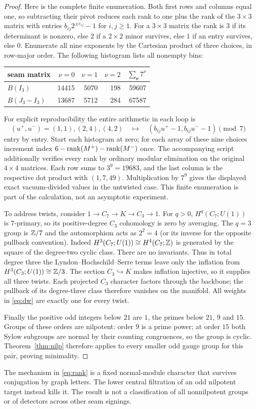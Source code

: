 \begin{proof}
Here is the complete finite enumeration. Both first rows and
columns equal one, so subtracting their pivot reduces each
rank to one plus the rank of the \(3\times3\) matrix with entries
\(b_{ij}2^{\pm e_{ij}}-1\) for \(i,j\ge1\). For a \(3\times3\)
matrix the rank is \(3\) if its determinant is nonzero, else
\(2\) if a \(2\times2\) minor survives, else \(1\) if an entry
survives, else \(0\). Enumerate all nine exponents by the Cartesian
product of three choices, in row-major order. The following
histogram lists all nonempty bins:
\begin{center}
\begin{tabular}{lrrrr}
\toprule
seam matrix & \(\nu=0\) & \(\nu=1\) & \(\nu=2\) &
          \(\sum_{\mathbf e}7^\nu\)\\
\midrule
\(B(I_3)\)       & 14415 & 5070 & 198 & 59607\\
\(B(J_3-I_3)\)   & 13687 & 5712 & 284 & 67587\\
\bottomrule
\end{tabular}
\end{center}
For explicit reproducibility the entire arithmetic in each loop
is
\[
 (u^+,u^-)=(1,1),(2,4),(4,2)\quad
 \longmapsto\quad
 (b_{ij}u^+-1,b_{ij}u^--1)\pmod 7
\]
entry by entry. Start each histogram at zero; for each array of
these nine choices increment index
\(6-\operatorname{rank}(M^+)-\operatorname{rank}(M^-)\) once.
The accompanying script additionally verifies every rank by
ordinary modular elimination on the original \(4\times4\)
matrices. Each row sums to \(3^9=19683\), and the last column is
the respective dot product with \((1,7,49)\). Multiplication by
\(7^9\) gives the displayed exact vacuum-divided values in the
untwisted case. This finite enumeration is part of the calculation,
not an asymptotic experiment.

To address twists, consider \(1\to C_7\to K\to C_3\to1\).
For \(q>0\), \(H^q(C_7;U(1))\) is \(7\)-primary, so its
positive-degree \(C_3\) cohomology is zero by averaging.
The \(q=3\) group is \(\mathbb Z/7\) and the automorphism acts as
\(2^2=4\) (or its inverse for the opposite pullback convention).
Indeed \(H^3(C_7;U(1))\cong H^4(C_7;\mathbb Z)\) is generated by
the square of the degree-two cyclic class. There are no invariants.
Thus in total degree three the Lyndon--Hochschild--Serre terms
leave only the inflation from \(H^3(C_3;U(1))\cong\mathbb Z/3\).
The section \(C_3\hookrightarrow K\) makes inflation injective,
so it supplies all three twists. Each projected \(C_3\)
character factors through the backbone; the pullback of its
degree-three class therefore vanishes on the manifold.
All weights in \eqref{eq:dw} are exactly one for every twist.

Finally the positive odd integers below \(21\) are \(1\),
the primes below \(21\), \(9\) and \(15\). Groups of these
orders are nilpotent: order \(9\) is a prime power; at order
\(15\) both Sylow subgroups are normal by their counting
congruences, so the group is cyclic. Theorem~\ref{thm:nilp}
therefore applies to every smaller odd gauge group for this
pair, proving minimality.
\end{proof}

The mechanism in \eqref{eq:rank} is a fixed normal-module
character that survives conjugation by graph letters.
The lower central filtration of an odd nilpotent target instead
kills it. The result is not a classification of all nonnilpotent
groups or of detectors across other seam signings.
